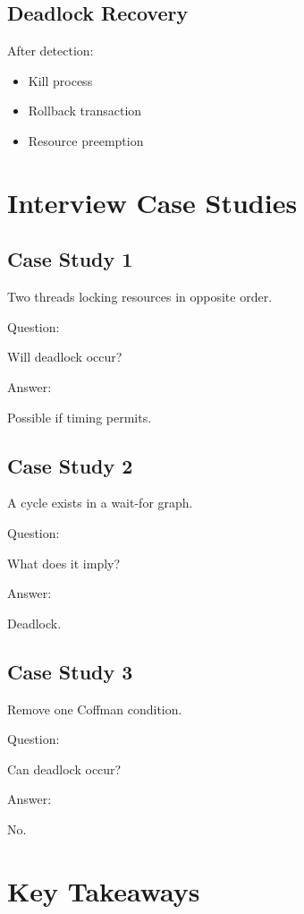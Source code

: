 \subsection{Deadlock Recovery}

After detection:

\begin{itemize}
\item Kill process
\item Rollback transaction
\item Resource preemption
\end{itemize}

\section{Interview Case Studies}

\subsection{Case Study 1}

Two threads locking resources in opposite order.

Question:

Will deadlock occur?

Answer:

Possible if timing permits.

\subsection{Case Study 2}

A cycle exists in a wait-for graph.

Question:

What does it imply?

Answer:

Deadlock.

\subsection{Case Study 3}

Remove one Coffman condition.

Question:

Can deadlock occur?

Answer:

No.

\section{Key Takeaways}

